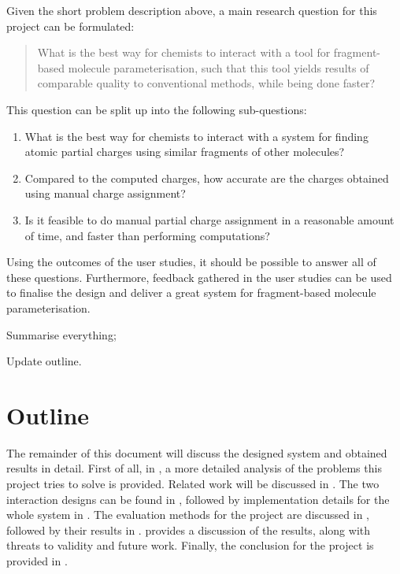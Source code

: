 Given the short problem description above, a main research question for this project can be formulated:
\begin{quote}
What is the best way for chemists to interact with a tool for fragment-based molecule parameterisation, such that this tool yields results of comparable quality to conventional methods, while being done faster?
\end{quote}

This question can be split up into the following sub-questions:
\begin{enumerate}
\item What is the best way for chemists to interact with a system for finding atomic partial charges using similar fragments of other molecules?
\item Compared to the computed charges, how accurate are the charges obtained using manual charge assignment?
\item Is it feasible to do manual partial charge assignment in a reasonable amount of time, and faster than performing computations?
\end{enumerate}
Using the outcomes of the user studies, it should be possible to answer all of these questions. Furthermore, feedback gathered in the user studies can be used to finalise the design and deliver a great system for fragment-based molecule parameterisation.

\begin{todo}
\item Summarise everything;
\item Update outline.
\end{todo}

\section{Outline}
The remainder of this document will discuss the designed system and obtained results in detail. First of all, in , a more detailed analysis of the problems this project tries to solve is provided. Related work will be discussed in . The two interaction designs can be found in , followed by implementation details for the whole system in . The evaluation methods for the project are discussed in , followed by their results in .  provides a discussion of the results, along with threats to validity and future work. Finally, the conclusion for the project is provided in .
